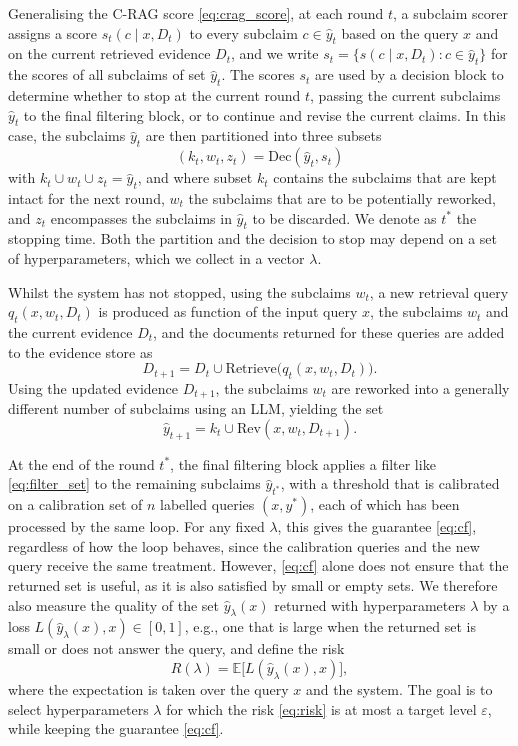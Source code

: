 Generalising the C-RAG score \eqref{eq:crag_score}, at each round $t$, a subclaim scorer assigns a score $s_t(c \mid x, D_t)$ to every subclaim $c \in \hat{y}_t$ based on the query $x$ and on the current retrieved evidence $D_t$, and we write $s_t = \{ s(c \mid x, D_t) : c \in \hat{y}_t \}$ for the scores of all subclaims of set $\hat{y}_t$. The scores $s_t$ are used by a decision block to determine whether to stop at the current round $t$, passing the current subclaims $\hat{y}_t$ to the final filtering block, or to continue and revise the current claims. In this case, the subclaims $\hat{y}_t$ are then partitioned into three subsets
\begin{equation}
  (k_t, w_t, z_t) = \mathrm{Dec}(\hat{y}_t, s_t)
\end{equation}
with $k_t \cup w_t \cup z_t = \hat{y}_t$, and where subset $k_t$ contains the subclaims that are kept intact for the next round, $w_t$ the subclaims that are to be potentially reworked, and $z_t$ encompasses the subclaims in $\hat{y}_t$ to be discarded. We denote as $t^{*}$ the stopping time. Both the partition and the decision to stop may depend on a set of hyperparameters, which we collect in a vector $\lambda$.

Whilst the system has not stopped, using the subclaims $w_t$, a new retrieval query $q_t(x, w_t, D_t)$ is produced as function of the input query $x$, the subclaims $w_t$ and the current evidence $D_t$, and the documents returned for these queries are added to the evidence store as
\begin{equation}
  D_{t+1} = D_t \cup \mathrm{Retrieve}\bigl(q_t(x, w_t, D_t)\bigr).
  \label{eq:store}
\end{equation}
Using the updated evidence $D_{t+1}$, the subclaims $w_t$ are reworked into a generally different number of subclaims using an LLM, yielding the set 
\begin{equation}
  \hat{y}_{t+1} = k_t \cup \mathrm{Rev}(x, w_t, D_{t+1}).
\end{equation}

At the end of the round $t^{*}$, the final filtering block applies a filter like \eqref{eq:filter_set} to the remaining subclaims $\hat{y}_{t^*}$, with a threshold that is calibrated on a calibration set of $n$ labelled queries $(x, y^{*})$, each of which has been processed by the same loop. For any fixed $\lambda$, this gives the guarantee \eqref{eq:cf}, regardless of how the loop behaves, since the calibration queries and the new query receive the same treatment. However, \eqref{eq:cf} alone does not ensure that the returned set is useful, as it is also satisfied by small or empty sets. We therefore also measure the quality of the set $\hat{y}_{\lambda}(x)$ returned with hyperparameters $\lambda$ by a loss $L(\hat{y}_{\lambda}(x), x) \in [0, 1]$, e.g., one that is large when the returned set is small or does not answer the query, and define the risk
\begin{equation}
  R(\lambda) = \mathbb{E}\bigl[ L(\hat{y}_{\lambda}(x), x) \bigr],
  \label{eq:risk}
\end{equation}
where the expectation is taken over the query $x$ and the system. The goal is to select hyperparameters $\lambda$ for which the risk \eqref{eq:risk} is at most a target level $\varepsilon$, while keeping the guarantee \eqref{eq:cf}.